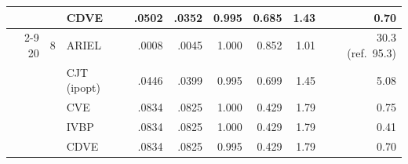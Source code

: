 \begin{table}[htbp]
\begin{tabular}{rrlrrrrrr}
 &  & CDVE & .0502 & .0352 & 0.995 & 0.685 & 1.43 & 0.70 \\
\cmidrule(l){2-9}
20 & 8 & ARIEL & .0008 & .0045 & 1.000 & 0.852 & 1.01 & 30.3 (ref.\ 95.3) \\
 &  & CJT (ipopt) & .0446 & .0399 & 0.995 & 0.699 & 1.45 & 5.08 \\
 &  & CVE & .0834 & .0825 & 1.000 & 0.429 & 1.79 & 0.75 \\
 &  & IVBP & .0834 & .0825 & 1.000 & 0.429 & 1.79 & 0.41 \\
 &  & CDVE & .0834 & .0825 & 0.995 & 0.429 & 1.79 & 0.70 \\
\bottomrule
\end{tabular}
\end{table}

